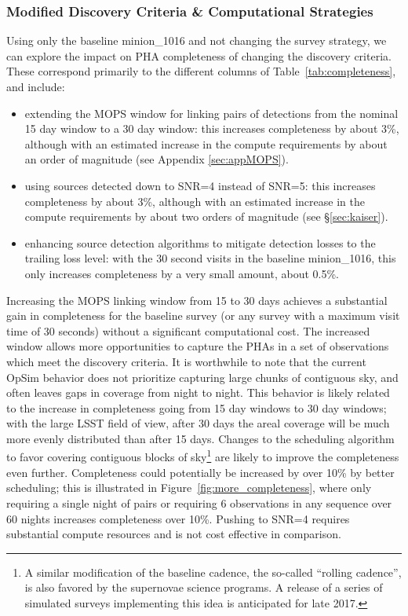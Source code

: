 \subsubsection{Modified Discovery Criteria \& Computational Strategies}

Using only the baseline minion\_1016 and not changing the survey strategy, we can explore the impact on PHA completeness of changing the discovery criteria. These correspond primarily to the different columns of Table~\ref{tab:completeness}, and include:

\begin{itemize}
\item extending the MOPS window for linking pairs of detections from the nominal 15 day window to a 30 day window: this increases completeness by about 3\%, although with an estimated increase in the compute requirements by about an order of magnitude (see Appendix \ref{sec:appMOPS}).
\item using sources detected down to SNR=4 instead of SNR=5: this increases completeness by about 3\%, although with an estimated increase in the compute requirements by about two orders of magnitude (see \S\ref{sec:kaiser}).
\item enhancing source detection algorithms to mitigate detection losses to the trailing loss level: with the 30 second visits in the baseline minion\_1016, this only increases completeness by a very small amount, about 0.5\%.
\end{itemize}

Increasing the MOPS linking window from 15 to 30 days achieves a substantial gain in completeness for the baseline survey
(or any survey with a maximum visit time of 30 seconds) without a significant computational cost. The increased window allows more opportunities to capture the PHAs in a set of observations which meet the discovery criteria. It is worthwhile to note that the current OpSim behavior does not prioritize capturing large chunks of contiguous sky, and often leaves gaps in coverage from night to night. This behavior is likely related to the increase in completeness going from 15 day windows to 30 day windows; with the large LSST field of view, after 30 days the areal coverage will be much more evenly distributed than after 15 days. Changes to the scheduling algorithm to favor covering contiguous blocks of sky\footnote{A similar modification of
the baseline cadence, the so-called ``rolling cadence'', is also favored by the supernovae science programs. A release of a series of simulated surveys implementing this idea is anticipated for late 2017.} are likely to improve the completeness even further. Completeness could potentially be increased by over 10\% by better scheduling; this is illustrated in Figure~\ref{fig:more_completeness}, where only requiring a single night of pairs or requiring 6 observations in any sequence over 60 nights increases completeness over 10\%.  Pushing to SNR=4 requires substantial
compute resources and is not cost effective in comparison.


